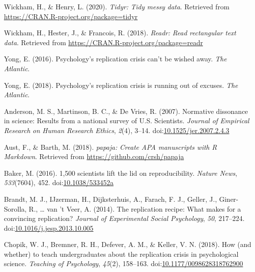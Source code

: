 \documentclass[
  man,mask,floatsintext]{apa6}
\newlength{\cslhangindent}
\newenvironment{cslreferences}%
  {\setlength{\parindent}{0pt}%
  \everypar{\setlength{\hangindent}{\cslhangindent}}\ignorespaces}%
  {\par}
\begin{document}
\begin{cslreferences}
\leavevmode\hypertarget{ref-R-tidyr}{}%
Wickham, H., \& Henry, L. (2020). \emph{Tidyr: Tidy messy data}. Retrieved from \url{https://CRAN.R-project.org/package=tidyr}

\leavevmode\hypertarget{ref-R-readr}{}%
Wickham, H., Hester, J., \& Francois, R. (2018). \emph{Readr: Read rectangular text data}. Retrieved from \url{https://CRAN.R-project.org/package=readr}

\leavevmode\hypertarget{ref-yongPsychologyReplicationCrisis2016}{}%
Yong, E. (2016). Psychology's replication crisis can't be wished away. \emph{The Atlantic}.

\leavevmode\hypertarget{ref-yongPsychologyReplicationCrisis2018}{}%
Yong, E. (2018). Psychology's replication crisis is running out of excuses. \emph{The Atlantic}.

\leavevmode\hypertarget{ref-andersonNormativeDissonanceScience2007}{}%
Anderson, M. S., Martinson, B. C., \& De Vries, R. (2007). Normative dissonance in science: Results from a national survey of U.S. Scientists. \emph{Journal of Empirical Research on Human Research Ethics}, \emph{2}(4), 3--14. doi:\href{https://doi.org/10.1525/jer.2007.2.4.3}{10.1525/jer.2007.2.4.3}

\leavevmode\hypertarget{ref-R-papaja}{}%
Aust, F., \& Barth, M. (2018). \emph{papaja: Create APA manuscripts with R Markdown}. Retrieved from \url{https://github.com/crsh/papaja}

\leavevmode\hypertarget{ref-baker500ScientistsLift2016}{}%
Baker, M. (2016). 1,500 scientists lift the lid on reproducibility. \emph{Nature News}, \emph{533}(7604), 452. doi:\href{https://doi.org/10.1038/533452a}{10.1038/533452a}

\leavevmode\hypertarget{ref-brandtReplicationRecipeWhat2014}{}%
Brandt, M. J., IJzerman, H., Dijksterhuis, A., Farach, F. J., Geller, J., Giner-Sorolla, R., \ldots{} van 't Veer, A. (2014). The replication recipe: What makes for a convincing replication? \emph{Journal of Experimental Social Psychology}, \emph{50}, 217--224. doi:\href{https://doi.org/10.1016/j.jesp.2013.10.005}{10.1016/j.jesp.2013.10.005}

\leavevmode\hypertarget{ref-chopikHowWhetherTeach2018}{}%
Chopik, W. J., Bremner, R. H., Defever, A. M., \& Keller, V. N. (2018). How (and whether) to teach undergraduates about the replication crisis in psychological science. \emph{Teaching of Psychology}, \emph{45}(2), 158--163. doi:\href{https://doi.org/10.1177/0098628318762900}{10.1177/0098628318762900}


\end{cslreferences}
\end{document}
